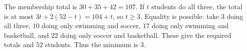 The membership total is $30+35+42=107$. If $t$ students do all three, the total is at most $3t+2(52-t)=104+t$, so $t\ge3$. Equality is possible: take $3$ doing all three, $10$ doing only swimming and soccer, $17$ doing only swimming and basketball, and $22$ doing only soccer and basketball. These give the required totals and $52$ students. Thus the minimum is $\boxed3$.
